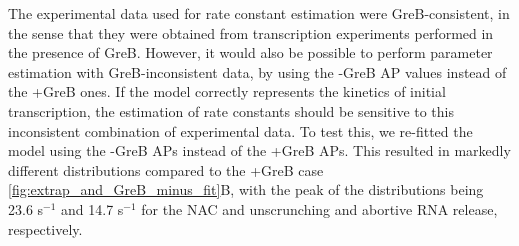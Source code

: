 The experimental data used for rate constant estimation were GreB-consistent, 
in the sense that they were obtained from transcription experiments performed
in the presence of GreB. However, it would also be possible to perform
parameter estimation with GreB-inconsistent data, by using the -GreB AP values
instead of the +GreB ones. If the model correctly represents the kinetics of
initial transcription, the estimation of rate constants should be sensitive to
this inconsistent combination of experimental data. To test this, we re-fitted
the model using the -GreB APs instead of the +GreB APs. This resulted in
markedly different distributions compared to the +GreB case
\ref{fig:extrap_and_GreB_minus_fit}B, with the peak of the distributions being
23.6 s$^{-1}$ and 14.7 s$^{-1}$ for the NAC and unscrunching and abortive RNA
release, respectively.
